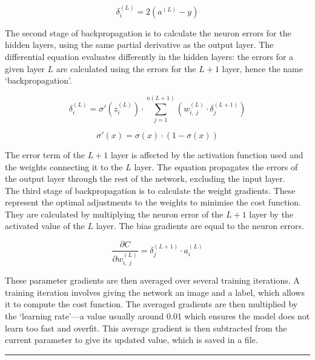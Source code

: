 \documentclass{article}
\begin{document}
\begin{equation*}
    \delta_i^{(L)}=2(a^{(L)}-y)
\end{equation*}

The second stage of backpropagation is to calculate the neuron errors for the hidden layers, using the same partial derivative as the output layer. The differential equation evaluates differently in the hidden layers: the errors for a given layer \(L\) are calculated using the errors for the \(L+1\) layer, hence the name `backpropagation'.

\begin{equation*}
    \delta_i^{(L)}=\sigma'(z_i^{(L)})\cdot \sum_{j=1}^{n(L+1)}\left({w_{i,\ j}^{(L)}\cdot \delta_j^{(L+1)}}\right  )
\end{equation*}

\begin{equation*}
    \sigma'(x)=\sigma(x)\cdot (1-\sigma(x))
\end{equation*}

The error term of the \(L+1\) layer is affected by the activation function used and the weights connecting it to the \(L\) layer. The equation propagates the errors of the output layer through the rest of the network, excluding the input layer. \\

The third stage of backpropagation is to calculate the weight gradients. These represent the optimal adjustments to the weights to minimise the cost function. They are calculated by multiplying the neuron error of the \(L+1\) layer by the activated value of the \(L\) layer. The bias gradients are equal to the neuron errors.

\begin{equation*}
    \frac{\partial C}{\partial w_{i,\ j}^{(L)}}=\delta_j^{(L+1)}\cdot a_i^{(L)}
\end{equation*}

These parameter gradients are then averaged over several training iterations. A training iteration involves giving the network an image and a label, which allows it to compute the cost function. The averaged gradients are then multiplied by the `learning rate'---a value usually around 0.01 which ensures the model does not learn too fast and overfit. This average gradient is then subtracted from the current parameter to give its updated value, which is saved in a file.

\begin{center}
\rule{0.5\linewidth}{0.4pt}
\end{center}
\end{document}
